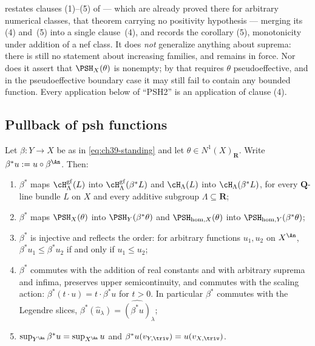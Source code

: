 \begin{remark}
\label{rem:ch39-closure-scope}
 restates clauses (1)--(5) of
 --- which are already proved there for arbitrary
numerical classes, that theorem carrying no positivity hypothesis --- merging
its (4) and~(5) into a single clause~(4), and records the corollary (5),
monotonicity under addition of a nef class.
It does \emph{not} generalize anything about suprema: there is still no
statement about increasing families, and  remains
in force.  Nor does it assert that $\PSH_X(\theta)$ is nonempty; by
 that requires $\theta$ pseudoeffective, and
in the pseudoeffective boundary case it may still fail to contain any
bounded function.  Every application below of ``PSH2'' is an application of
clause (4).
\end{remark}

\subsection{Pullback of psh functions}
\label{sec:ch39-pullback}

\begin{theorem}
\label{thm:ch39-pullback}
Let $\beta:Y\to X$ be as in \eqref{eq:ch39-standing} and let
$\theta\in N^1(X)_{\mathbf R}$.  Write
$\beta^*u:=u\circ\beta^{\An}$.  Then:
\begin{enumerate}
\item\label{itm:ch39-pb:fs} $\beta^*$ maps
 $\cH^{\mathrm{gf}}_\Lambda(L)$ into
 $\cH^{\mathrm{gf}}_\Lambda(\beta^*L)$ and $\cH_\Lambda(L)$ into
 $\cH_\Lambda(\beta^*L)$, for every $\mathbf Q$-line bundle $L$ on
 $X$ and every additive subgroup $\Lambda\subseteq\mathbf R$;
\item\label{itm:ch39-pb:psh} $\beta^*$ maps $\PSH_X(\theta)$ into
 $\PSH_Y(\beta^*\theta)$ and
 $\PSH_{\mathrm{hom},X}(\theta)$ into
 $\PSH_{\mathrm{hom},Y}(\beta^*\theta)$;
\item\label{itm:ch39-pb:order} $\beta^*$ is injective and reflects the
 order: for arbitrary functions $u_1,u_2$ on $X^{\An}$,
 $\beta^*u_1\le\beta^*u_2$ if and only if $u_1\le u_2$;
\item\label{itm:ch39-pb:ops} $\beta^*$ commutes with the addition of
 real constants and with arbitrary suprema and infima, preserves upper
 semicontinuity, and commutes with the scaling action:
 $\beta^*(t\cdot u)=t\cdot\beta^*u$ for $t>0$.
 In particular $\beta^*$ commutes with the Legendre slices,
 $\beta^*(\widehat u_\lambda)=\widehat{(\beta^*u)}_\lambda$;
\item\label{itm:ch39-pb:sup} $\sup_{Y^{\An}}\beta^*u=\sup_{X^{\An}}u$ and
 $\beta^*u(v_{Y,\triv})=u(v_{X,\triv})$.
\end{enumerate}
\end{theorem}


